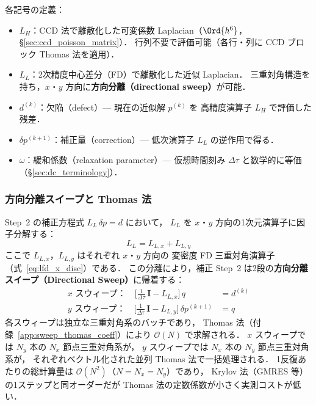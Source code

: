 各記号の定義：
\begin{itemize}
  \item $L_H$：CCD 法で離散化した可変係数 Laplacian（$\Ord{h^6}$，§\ref{sec:ccd_poisson_matrix}）．
        行列不要で評価可能（各行・列に CCD ブロック Thomas 法を適用）．
  \item $L_L$：2次精度中心差分（FD）で離散化した近似 Laplacian．
        三重対角構造を持ち，$x$・$y$ 方向に\textbf{方向分離（directional sweep）}が可能．
  \item $d^{(k)}$：欠陥（defect）— 現在の近似解 $p^{(k)}$ を
        高精度演算子 $L_H$ で評価した残差．
  \item $\delta p^{(k+1)}$：補正量（correction）— 低次演算子 $L_L$ の逆作用で得る．
  \item $\omega$：緩和係数（relaxation parameter）—
        仮想時間刻み $\Delta\tau$ と数学的に等価（§\ref{sec:dc_terminology}）．
\end{itemize}

\subsubsection{方向分離スイープと Thomas 法}
\label{sec:dc_sweep}

Step~2 の補正方程式 $L_L\,\delta p = d$ において，
$L_L$ を $x$・$y$ 方向の1次元演算子に因子分解する：
\begin{equation}
  L_L = L_{L,x} + L_{L,y}
  \label{eq:ll_split}
\end{equation}
ここで $L_{L,x}$，$L_{L,y}$ はそれぞれ $x$・$y$ 方向の
変密度 FD 三重対角演算子（式~\eqref{eq:lfd_x_disc}）である．
この分離により，補正 Step~2 は2段の\textbf{方向分離スイープ（Directional Sweep）}に帰着する：
\begin{align}
  \text{$x$ スウィープ：}\quad
    \bigl[\tfrac{1}{\Delta\tau}\,\mathbf{I} - L_{L,x}\bigr]\,q &= d^{(k)}
    \label{eq:dc_sweep_x} \\
  \text{$y$ スウィープ：}\quad
    \bigl[\tfrac{1}{\Delta\tau}\,\mathbf{I} - L_{L,y}\bigr]\,\delta p^{(k+1)} &= q
    \label{eq:dc_sweep_y}
\end{align}
各スウィープは独立な三重対角系のバッチであり，
Thomas 法（付録~\ref{app:sweep_thomas_coeff}）により $\mathcal{O}(N)$ で求解される．
$x$ スウィープでは $N_y$ 本の $N_x$ 節点三重対角系が，
$y$ スウィープでは $N_x$ 本の $N_y$ 節点三重対角系が，
それぞれベクトル化された並列 Thomas 法で一括処理される．
1反復あたりの総計算量は $\mathcal{O}(N^2)$（$N = N_x = N_y$）であり，
Krylov 法（GMRES 等）の1ステップと同オーダーだが Thomas 法の定数係数が小さく実測コストが低い．

